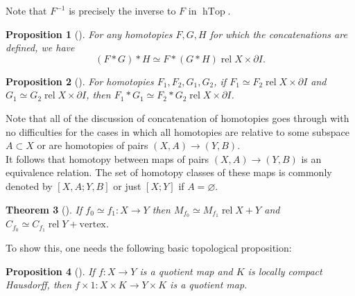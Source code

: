 \documentclass[reqno]{amsart}
\newtheorem{theorem}{Theorem}[section]
\newtheorem{proposition}[theorem]{Proposition}
\theoremstyle{definition}
\theoremstyle{remark}
\DeclareMathOperator{\hTop}{hTop}
\DeclareMathOperator{\rel}{rel}
\begin{document}
Note that $F^{-1}$ is precisely the inverse
to $F$ in $\hTop$.

\begin{proposition}[]
    For any homotopies $F,G,H$ for which the
    concatenations 
     are defined, we have
     \[
         \left( F * G  \right) * H
         \simeq F * \left( G * H \right) 
         \rel X \times \partial I.
     \] 
\end{proposition}


\begin{proposition}[]
    For homotopies $F_1, F_2, G_1, G_2$,
    if $F_1 \simeq F_2 \rel X \times \partial I$ and
    $G_1 \simeq G_2 \rel X \times \partial I$, then
    $F_1 * G_1 \simeq F_2 * G_2 \rel X \times \partial I$.
\end{proposition}

Note that all of the discussion of concatenation of
homotopies goes through with no difficulties for the cases
in which all homotopies are relative to some subspace
$A \subset X$ or are homotopies of pairs
$\left( X, A  \right) \to \left( Y, B \right) $.\\
It follows that homotopy between maps of
pairs $\left( X,A \right) \to \left( Y,B \right) $ is
an equivalence relation. The set of homotopy classes
of these maps is commonly denoted by
$\left[ X,A ; Y ,B \right] $ or just
$\left[ X;Y \right] $ if $A = \varnothing$.

\begin{theorem}[]\label{Thm:299221}
    If $f_0 \simeq f_1 \colon X \to Y$ then
    $M_{f_0} \simeq M_{f_1} \rel
    X + Y$ and
    $C_{f_0} \simeq C_{f_1} \rel
    Y + \text{vertex}$.
\end{theorem}


To show this, one needs the following basic topological
proposition:
\begin{proposition}[] \label{prop:92031999}
    If $f \colon X \to Y$ is a quotient map and
    $K$ is locally compact Hausdorff, then
    $f \times 1 \colon X \times K \to Y \times K$ is
    a quotient map.
\end{proposition}
\end{document}
